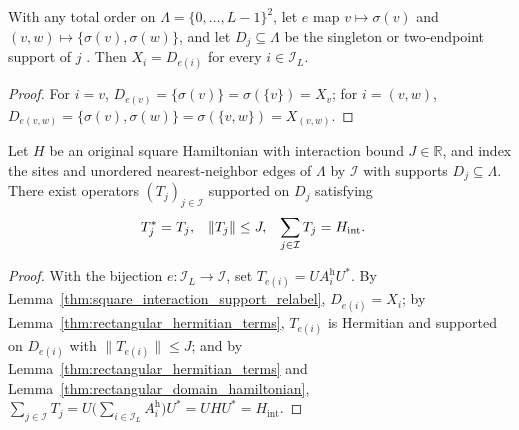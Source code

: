\begin{lemma}
    \label{thm:square_interaction_support_relabel}
    \leanok
    With any total order on $\Lambda=\{0,\ldots,L-1\}^2$, let $e$ map $v\mapsto\sigma(v)$
    and $(v,w)\mapsto\{\sigma(v),\sigma(w)\}$, and let $D_j\subseteq\Lambda$ be
    the singleton or two-endpoint support of $j$
    \cite[Section~1]{OpenAI2026PolynomialPEPS}. Then $X_i=D_{e(i)}$ for every
    $i\in\mathcal I_L$.
\end{lemma}
\begin{proof}\leanok
    For $i=v$, $D_{e(v)}=\{\sigma(v)\}=\sigma(\{v\})=X_v$; for $i=(v,w)$,
    $D_{e(v,w)}=\{\sigma(v),\sigma(w)\}=\sigma(\{v,w\})=X_{(v,w)}$.
\end{proof}

\begin{lemma}
    \label{thm:square_nearest_neighbor_terms}
    \leanok
    Let $H$ be an original square Hamiltonian with interaction bound $J\in\mathbb R$,
    and index the sites and unordered nearest-neighbor edges of $\Lambda$ by
    $\mathcal I$ with supports $D_j\subseteq\Lambda$. There exist operators
    $(T_j)_{j\in\mathcal I}$ supported on $D_j$ satisfying
    \begin{align}
        T_j^*                    & =T_j,                    &
        \|T_j\|                  & \le J,                   &
        \sum_{j\in\mathcal I}T_j & =H_{\mathrm{int}}.\notag
    \end{align}
\end{lemma}
\begin{proof}\leanok
    With the bijection $e:\mathcal I_L\to\mathcal I$, set
    $T_{e(i)}=U A_i^{\mathrm h}U^*$. By
    Lemma~\ref{thm:square_interaction_support_relabel}, $D_{e(i)}=X_i$; by
    Lemma~\ref{thm:rectangular_hermitian_terms}, $T_{e(i)}$ is Hermitian
    and supported on $D_{e(i)}$ with $\|T_{e(i)}\|\le J$; and by
    Lemma~\ref{thm:rectangular_hermitian_terms} and
    Lemma~\ref{thm:rectangular_domain_hamiltonian},
    $\sum_{j\in\mathcal I}T_j=U\bigl(\sum_{i\in\mathcal I_L}A_i^{\mathrm h}\bigr)U^*
        =UHU^*=H_{\mathrm{int}}$.
\end{proof}

